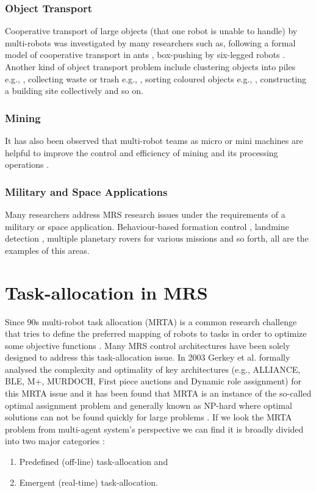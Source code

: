 \subsubsection*{Object Transport}
Cooperative transport of large objects (that one robot is unable to handle) by multi-robots was investigated by many researchers such as, following a formal model of cooperative transport in ants \cite{Kube+1993}, box-pushing by six-legged robots \cite{Mataric+1995}. Another kind of object transport problem include clustering objects into piles e.g., \cite{Beckers+1994}, collecting waste or trash e.g., \cite{Parker1994}, sorting coloured objects e.g., \cite{Melhuish+1998}, constructing a building site collectively \cite{Wawerla+2002} and so on. 
\subsubsection*{Mining} 
It has also been observed that multi-robot teams as micro or mini machines are helpful to improve the control and efficiency of mining and its processing operations \cite{Dunbar+2002}.
\subsubsection*{Military and Space Applications}
Many researchers address MRS research issues under the requirements of a military or space application. Behaviour-based formation control \cite{Balch+1998}, landmine detection \cite{Franklin+1995}, multiple planetary rovers for various missions \cite{Huntsberger2004} and so forth, all are the examples of this areas.
\section{Task-allocation in MRS}
\label{bg:mrta}
Since 90s multi-robot task allocation (MRTA) is a common research challenge that tries to define the preferred mapping of robots to tasks in order to optimize some objective functions  \cite{Gerkey+2004}. Many MRS control architectures have been solely designed to address this task-allocation issue. In 2003 Gerkey et al. formally analysed the complexity and optimality of key architectures (e.g., ALLIANCE, BLE, M+, MURDOCH, First piece auctions and Dynamic role assignment) for this MRTA issue and it has been found that MRTA is an instance of the so-called optimal assignment problem \cite{Gerkey+2003} and generally known as NP-hard where optimal solutions can not be found quickly for large problems \cite{Gerkey+2004}. 
If we look the MRTA problem from multi-agent system's perspective we can find it is broadly divided into two major categories \cite{Shen+2001}: 
\begin{enumerate}
\item Predefined (off-line) task-allocation and 
\item Emergent (real-time) task-allocation. 
\end{enumerate}
